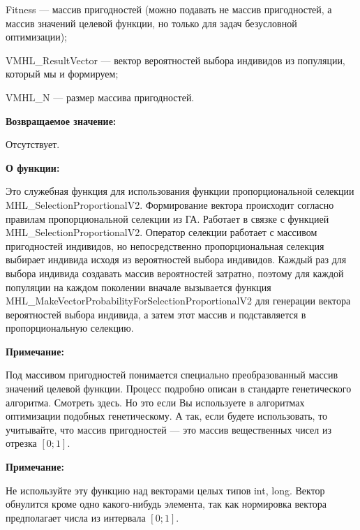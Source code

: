 \documentclass[a4paper,12pt]{article}
\begin{document}
Fitness --- массив пригодностей (можно подавать не массив пригодностей, а массив значений целевой функции, но только для задач безусловной оптимизации);
 
VMHL\_ResultVector --- вектор вероятностей выбора индивидов из популяции, который мы и формируем;
 
VMHL\_N --- размер массива пригодностей.

\textbf{Возвращаемое значение:} 

Отсутствует.

\textbf{О функции:}

 Это служебная функция для использования функции пропорциональной селекции MHL\_SelectionProportionalV2.
Формирование вектора происходит согласно правилам пропорциональной селекции из ГА.
Работает в связке с функцией MHL\_SelectionProportionalV2. Оператор селекции работает с массивом пригодностей индивидов, но непосредственно пропорциональная селекция выбирает индивида исходя из вероятностей выбора индивидов. Каждый раз для выбора индивида создавать массив вероятностей затратно, поэтому для каждой популяции на каждом поколении вначале вызывается функция MHL\_MakeVectorProbabilityForSelectionProportionalV2 для генерации вектора вероятностей выбора индивида, а затем этот массив и подставляется в пропорциональную селекцию.

\textbf{Примечание:}

 Под массивом пригодностей понимается специально преобразованный массив значений целевой функции. Процесс подробно описан в стандарте генетического алгоритма. Смотреть здесь. Но это если Вы используете в алгоритмах оптимизации подобных генетическому. А так, если будете использовать, то учитывайте, что массив пригодностей --- это массив вещественных чисел из отрезка $[0;1]$.
 
 \textbf{Примечание:} 

Не используйте эту функцию над векторами целых типов int, long. Вектор обнулится кроме одно какого-нибудь элемента, так как нормировка вектора предполагает числа из интервала $[0;1]$.
\end{document}
